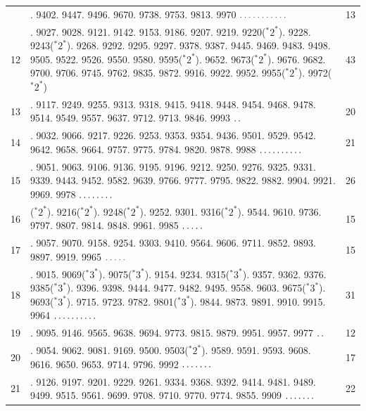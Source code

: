 \par\medskip
\begingroup\small
\setlength{\tabcolsep}{4pt}
\begin{longtable}{@{}r>{\raggedright\arraybackslash}p{}r@{}}
 & 9322. 9402. 9447. 9496. 9670. 9738. 9753. 9813. 9970 \(\mathinner{.\,.\,.\,.\,.\,.\,.\,.\,.\,.\,.}\) & 13\\
12 & 9018. 9027. 9028. 9121. 9142. 9153. 9186. 9207. 9219. 9220(${}^{*}2^{*}$). 9228. 9243(${}^{*}2^{*}$). 9268. 9292. 9295. 9297. 9378. 9387. 9445. 9469. 9483. 9498. 9505. 9522. 9526. 9550. 9580. 9595(${}^{*}2^{*}$). 9652. 9673(${}^{*}2^{*}$). 9676. 9682. 9700. 9706. 9745. 9762. 9835. 9872. 9916. 9922. 9952. 9955(${}^{*}2^{*}$). 9972(${}^{*}2^{*}$) & 43\\
13 & 9082. 9117. 9249. 9255. 9313. 9318. 9415. 9418. 9448. 9454. 9468. 9478. 9514. 9549. 9557. 9637. 9712. 9713. 9846. 9993 \(\mathinner{.\,.}\) & 20\\
14 & 9017. 9032. 9066. 9217. 9226. 9253. 9353. 9354. 9436. 9501. 9529. 9542. 9642. 9658. 9664. 9757. 9775. 9784. 9820. 9878. 9988 \(\mathinner{.\,.\,.\,.\,.\,.\,.\,.\,.\,.}\) & 21\\
15 & 9033. 9051. 9063. 9106. 9136. 9195. 9196. 9212. 9250. 9276. 9325. 9331. 9339. 9443. 9452. 9582. 9639. 9766. 9777. 9795. 9822. 9882. 9904. 9921. 9969. 9978 \(\mathinner{.\,.\,.\,.\,.\,.\,.\,.}\) & 26\\
16 & 9214(${}^{*}2^{*}$). 9216(${}^{*}2^{*}$). 9248(${}^{*}2^{*}$). 9252. 9301. 9316(${}^{*}2^{*}$). 9544. 9610. 9736. 9797. 9807. 9814. 9848. 9961. 9985 \(\mathinner{.\,.\,.\,.\,.}\) & 15\\
17 & 9002. 9057. 9070. 9158. 9254. 9303. 9410. 9564. 9606. 9711. 9852. 9893. 9897. 9919. 9965 \(\mathinner{.\,.\,.\,.\,.}\) & 15\\
18 & 9012. 9015. 9069(${}^{*}3^{*}$). 9075(${}^{*}3^{*}$). 9154. 9234. 9315(${}^{*}3^{*}$). 9357. 9362. 9376. 9385(${}^{*}3^{*}$). 9396. 9398. 9444. 9477. 9482. 9495. 9558. 9603. 9675(${}^{*}3^{*}$). 9693(${}^{*}3^{*}$). 9715. 9723. 9782. 9801(${}^{*}3^{*}$). 9844. 9873. 9891. 9910. 9915. 9964 \(\mathinner{.\,.\,.\,.\,.\,.\,.\,.\,.\,.}\) & 31\\
19 & 9053. 9095. 9146. 9565. 9638. 9694. 9773. 9815. 9879. 9951. 9957. 9977 \(\mathinner{.\,.}\) & 12\\
20 & 9039. 9054. 9062. 9081. 9169. 9500. 9503(${}^{*}2^{*}$). 9589. 9591. 9593. 9608. 9616. 9650. 9653. 9714. 9796. 9992 \(\mathinner{.\,.\,.\,.\,.\,.\,.}\) & 17\\
21 & 9036. 9126. 9197. 9201. 9229. 9261. 9334. 9368. 9392. 9414. 9481. 9489. 9499. 9515. 9561. 9699. 9708. 9710. 9770. 9774. 9855. 9909 \(\mathinner{.\,.\,.\,.\,.\,.\,.}\) & 22\\

\end{longtable}
